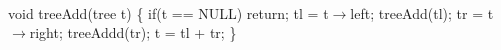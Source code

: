 {\tt
\begin{program}{0}
   void treeAdd(tree t) \{
    if(t == NULL)
   return;
       tl = t$\rightarrow$left;
       treeAdd(tl);
       tr = t$\rightarrow$right;
       treeAddd(tr);
  	t = tl + tr;
   \}
\end{program}
}